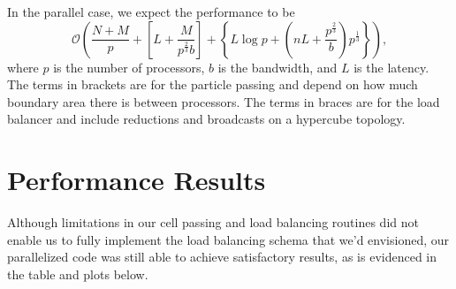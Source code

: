 \documentclass[]{article}
\begin{document}
In the parallel case, we expect the performance to be
\begin{equation}
\mathcal{O} \left(\frac{N+M}{p} + \left[L + \frac{M}{p^\frac{2}{3}b}\right] + \left\{L \log p + (nL + \frac{p^\frac{2}{3}}{b} )p^{\frac{1}{3}}\right\}\right),
\end{equation}
where $p$ is the number of processors, $b$ is the bandwidth, and $L$ is the latency.  The terms in brackets are for the particle passing and depend on how much boundary area there is between processors.  The terms in braces are for the load balancer and include reductions and broadcasts on a hypercube topology.

\section{Performance Results}
Although limitations in our cell passing and load balancing routines did not enable us to fully implement the load balancing schema that we'd envisioned, our parallelized code was still able to achieve satisfactory results, as is evidenced in the table and plots below.
\end{document}
